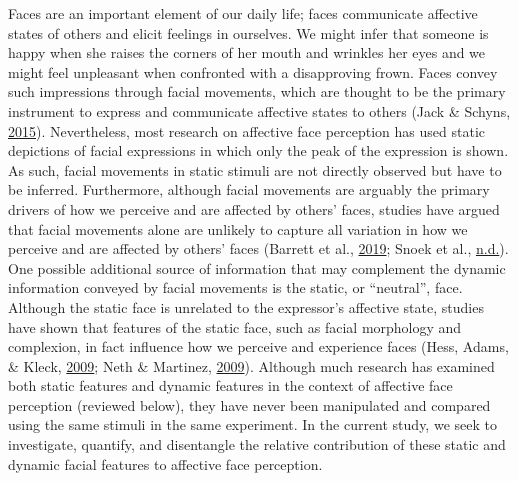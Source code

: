 \documentclass[11pt,american,a4paper,oneside,]{memoir} %
\begin{document}
Faces are an important element of our daily life; faces communicate affective states of others and elicit feelings in ourselves. We might infer that someone is happy when she raises the corners of her mouth and wrinkles her eyes and we might feel unpleasant when confronted with a disapproving frown. Faces convey such impressions through facial movements, which are thought to be the primary instrument to express and communicate affective states to others (Jack \& Schyns, \protect\hyperlink{ref-Jack2015-sh}{2015}). Nevertheless, most research on affective face perception has used static depictions of facial expressions in which only the peak of the expression is shown. As such, facial movements in static stimuli are not directly observed but have to be inferred. Furthermore, although facial movements are arguably the primary drivers of how we perceive and are affected by others' faces, studies have argued that facial movements alone are unlikely to capture all variation in how we perceive and are affected by others' faces (Barrett et al., \protect\hyperlink{ref-Barrett2019-bc}{2019}; Snoek et al., \protect\hyperlink{ref-snoek-submitted}{n.d.}). One possible additional source of information that may complement the dynamic information conveyed by facial movements is the static, or ``neutral'', face. Although the static face is unrelated to the expressor's affective state, studies have shown that features of the static face, such as facial morphology and complexion, in fact influence how we perceive and experience faces (Hess, Adams, \& Kleck, \protect\hyperlink{ref-Hess2009-xo}{2009}; Neth \& Martinez, \protect\hyperlink{ref-Neth2009-eh}{2009}). Although much research has examined both static features and dynamic features in the context of affective face perception (reviewed below), they have never been manipulated and compared using the same stimuli in the same experiment. In the current study, we seek to investigate, quantify, and disentangle the relative contribution of these static and dynamic facial features to affective face perception.
\end{document}
